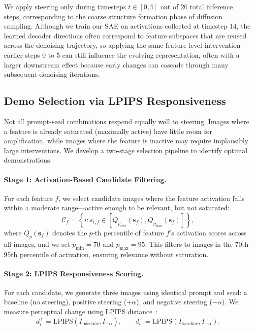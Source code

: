 \documentclass{article}
\begin{document}
We apply steering only during timesteps $t \in [0, 5]$ out of 20 total inference steps, corresponding to the coarse structure formation phase of diffusion sampling. Although we train our SAE on activations collected at timestep 14, the learned decoder directions often correspond to feature subspaces that are reused across the denoising trajectory, so applying the same feature level intervention earlier steps 0 to 5 can still influence the evolving representation, often with a larger downstream effect because early changes can cascade through many subsequent denoising iterations.

\subsection{Demo Selection via LPIPS Responsiveness}

Not all prompt-seed combinations respond equally well to steering. Images where a feature is already saturated (maximally active) have little room for amplification, while images where the feature is inactive may require implausibly large interventions. We develop a two-stage selection pipeline to identify optimal demonstrations.

\paragraph{Stage 1: Activation-Based Candidate Filtering.}
For each feature $f$, we select candidate images where the feature activation falls within a moderate range---active enough to be relevant, but not saturated:
\begin{equation}
\mathcal{C}_f = \left\{ i : s_{i,f} \in \left[ Q_{p_{\min}}(\mathbf{s}_f), Q_{p_{\max}}(\mathbf{s}_f) \right] \right\},
\end{equation}
where $Q_p(\mathbf{s}_f)$ denotes the $p$-th percentile of feature $f$'s activation scores across all images, and we set $p_{\min} = 70$ and $p_{\max} = 95$. This filters to images in the 70th--95th percentile of activation, ensuring relevance without saturation.

\paragraph{Stage 2: LPIPS Responsiveness Scoring.}
For each candidate, we generate three images using identical prompt and seed: a baseline (no steering), positive steering ($+\alpha$), and negative steering ($-\alpha$). We measure perceptual change using LPIPS distance~\citep{zhang2018perceptual}:
\begin{equation}
d^+_i = \mathrm{LPIPS}(I_{\text{baseline}}, I_{+\alpha}), \qquad d^-_i = \mathrm{LPIPS}(I_{\text{baseline}}, I_{-\alpha}).
\end{equation}
\end{document}
